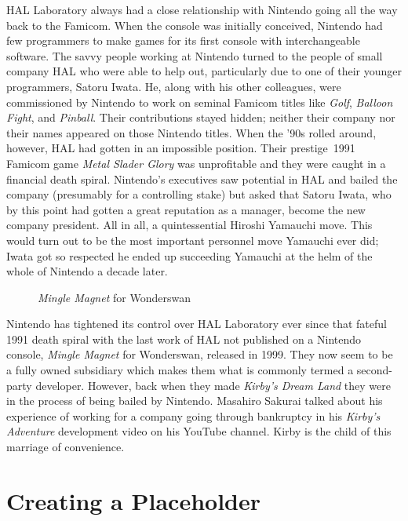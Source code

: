 \documentclass{book}
\begin{document}
HAL Laboratory always had a close relationship with Nintendo going all the way back to the Famicom. When the console was initially conceived, Nintendo had few programmers to make games for its first console with interchangeable software. The savvy people working at Nintendo turned to the people of small company HAL who were able to help out, particularly due to one of their younger programmers, Satoru Iwata. He, along with his other colleagues, were commissioned by Nintendo to work on seminal Famicom titles like \emph{Golf}, \emph{Balloon Fight}, and \emph{Pinball}. Their contributions stayed hidden; neither their company nor their names appeared on those Nintendo titles. When the ’90s rolled around, however, HAL had gotten in an impossible position. Their prestige~1991 Famicom game \emph{Metal Slader Glory} was unprofitable and they were caught in a financial death spiral. Nintendo’s executives saw potential in HAL and bailed the company (presumably for a controlling stake) but asked that Satoru Iwata, who by this point had gotten a great reputation as a manager, become the new company president. All in all, a quintessential Hiroshi Yamauchi move. This would turn out to be the most important personnel move Yamauchi ever did; Iwata got so respected he ended up succeeding Yamauchi at the helm of the whole of Nintendo a decade later.\par
\FloatBarrier\vspace{\baselineskip}\begin{figure}[H]\caption*{\emph{Mingle Magnet} for Wonderswan}\end{figure}
Nintendo has tightened its control over HAL Laboratory ever since that fateful 1991 death spiral with the last work of HAL not published on a Nintendo console, \emph{Mingle Magnet} for Wonderswan, released in 1999. They now seem to be a fully owned subsidiary which makes them what is commonly termed a second-party developer. However, back when they made \emph{Kirby’s Dream Land} they were in the process of being bailed by Nintendo. Masahiro Sakurai talked about his experience of working for a company going through bankruptcy in his \emph{Kirby’s Adventure} development video on his YouTube channel. Kirby is the child of this marriage of convenience.\par
\FloatBarrier\section*{Creating a Placeholder}
\end{document}
